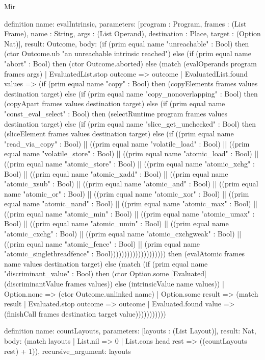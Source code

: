 \begin{lexlean}{Mir}
\begin{semanticmodule}
definition{
  name: evalIntrinsic,
  parameters: [program : Program, frames : (List Frame), name : String, args : (List Operand), destination : Place, target : (Option Nat)],
  result: Outcome,
  body: (if (prim equal name "unreachable" : Bool) then (ctor Outcome.ub "an unreachable intrinsic reached") else (if (prim equal name "abort" : Bool) then (ctor Outcome.aborted) else (match (evalOperands program frames args)
    | EvaluatedList.stop outcome => outcome
    | EvaluatedList.found values => (if (prim equal name "copy" : Bool) then (copyElements frames values destination target) else (if (prim equal name "copy_nonoverlapping" : Bool) then (copyApart frames values destination target) else (if (prim equal name "const_eval_select" : Bool) then (selectRuntime program frames values destination target) else (if (prim equal name "slice_get_unchecked" : Bool) then (sliceElement frames values destination target) else (if ((prim equal name "read_via_copy" : Bool) || ((prim equal name "volatile_load" : Bool) || ((prim equal name "volatile_store" : Bool) || ((prim equal name "atomic_load" : Bool) || ((prim equal name "atomic_store" : Bool) || ((prim equal name "atomic_xchg" : Bool) || ((prim equal name "atomic_xadd" : Bool) || ((prim equal name "atomic_xsub" : Bool) || ((prim equal name "atomic_and" : Bool) || ((prim equal name "atomic_or" : Bool) || ((prim equal name "atomic_xor" : Bool) || ((prim equal name "atomic_nand" : Bool) || ((prim equal name "atomic_max" : Bool) || ((prim equal name "atomic_min" : Bool) || ((prim equal name "atomic_umax" : Bool) || ((prim equal name "atomic_umin" : Bool) || ((prim equal name "atomic_cxchg" : Bool) || ((prim equal name "atomic_cxchgweak" : Bool) || ((prim equal name "atomic_fence" : Bool) || (prim equal name "atomic_singlethreadfence" : Bool)))))))))))))))))))) then (evalAtomic frames name values destination target) else (match (if (prim equal name "discriminant_value" : Bool) then (ctor Option.some [Evaluated] (discriminantValue frames values)) else (intrinsicValue name values))
      | Option.none => (ctor Outcome.unlinked name)
      | Option.some result => (match result
        | Evaluated.stop outcome => outcome
        | Evaluated.found value => (finishCall frames destination target value)))))))))))
}

definition{
  name: countLayouts,
  parameters: [layouts : (List Layout)],
  result: Nat,
  body: (match layouts | List.nil => 0 | List.cons head rest => ((countLayouts rest) + 1)),
  recursive_argument: layouts
}


\end{semanticmodule}
\end{lexlean}
